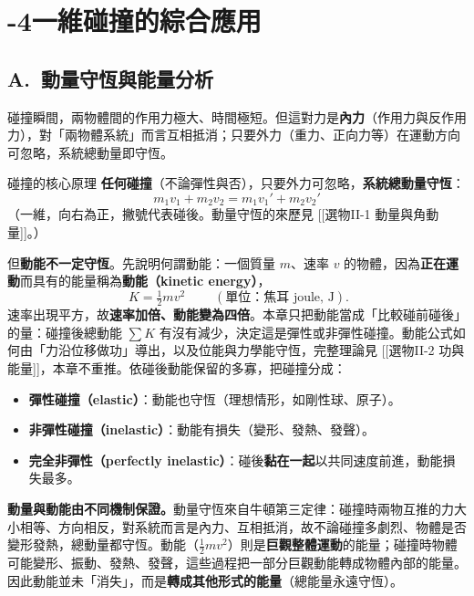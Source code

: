 \documentclass[11pt]{article}
\begin{document}
\section*{-4\quad 一維碰撞的綜合應用}

\subsection*{\sffamily A.\ 動量守恆與能量分析}

碰撞瞬間，兩物體間的作用力極大、時間極短。但這對力是\textbf{內力}（作用力與反作用力），對「兩物體系統」而言互相抵消；只要外力（重力、正向力等）在運動方向可忽略，系統總動量即守恆。

\begin{補充框}{碰撞的核心原理}
\textbf{任何碰撞}（不論彈性與否），只要外力可忽略，\textbf{系統總動量守恆}：
$$\boxed{\;m_1 v_1 + m_2 v_2 = m_1 v_1' + m_2 v_2'\;}$$
（一維，向右為正，撇號代表碰後。動量守恆的來歷見 [[選物II-1 動量與角動量]]。）

但\textbf{動能不一定守恆}。先說明何謂動能：一個質量 $m$、速率 $v$ 的物體，因為\textbf{正在運動}而具有的能量稱為\textbf{動能（kinetic energy）}，
$$\boxed{\;K = \tfrac12 m v^2\;}\qquad(\text{單位：焦耳 joule, J}).$$
速率出現平方，故\textbf{速率加倍、動能變為四倍}。本章只把動能當成「比較碰前碰後」的量：碰撞後總動能 $\sum K$ 有沒有減少，決定這是彈性或非彈性碰撞。動能公式如何由「力沿位移做功」導出，以及位能與力學能守恆，完整理論見 [[選物II-2 功與能量]]，本章不重推。依碰後動能保留的多寡，把碰撞分成：
\begin{itemize}\setlength{\itemsep}{1pt}
\item \textbf{彈性碰撞（elastic）}：動能也守恆（理想情形，如剛性球、原子）。
\item \textbf{非彈性碰撞（inelastic）}：動能有損失（變形、發熱、發聲）。
\item \textbf{完全非彈性（perfectly inelastic）}：碰後\textbf{黏在一起}以共同速度前進，動能損失最多。
\end{itemize}

\textbf{動量與動能由不同機制保證。}動量守恆來自牛頓第三定律：碰撞時兩物互推的力大小相等、方向相反，對系統而言是內力、互相抵消，故不論碰撞多劇烈、物體是否變形發熱，總動量都守恆。動能（$\tfrac12 mv^2$）則是\textbf{巨觀整體運動}的能量；碰撞時物體可能變形、振動、發熱、發聲，這些過程把一部分巨觀動能轉成物體內部的能量。因此動能並未「消失」，而是\textbf{轉成其他形式的能量}（總能量永遠守恆）。
\end{補充框}

\end{document}
